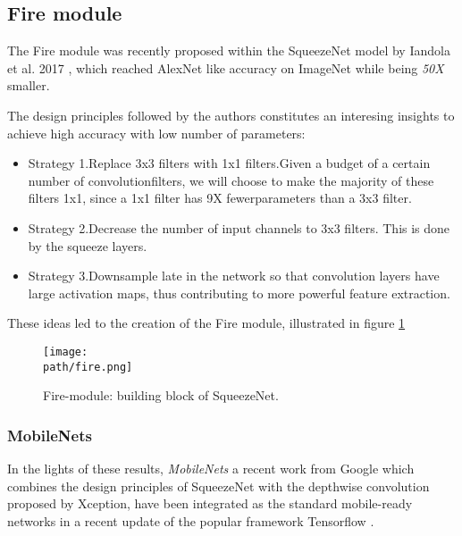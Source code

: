 \subsection{Fire module}
The Fire module was recently proposed within the SqueezeNet model by Iandola et al. 2017 \parencite{squeezenet}, which reached AlexNet like\parencite{alexnet} accuracy on ImageNet while being \emph{50X} smaller. 

The design principles followed by the authors constitutes an interesing insights to achieve high accuracy with low number of parameters:
\begin{itemize}
	\item Strategy 1.Replace 3x3 filters with 1x1 filters.Given a budget of a certain number of convolutionfilters,  we will choose to make the majority of these filters 1x1,  since a 1x1 filter has 9X fewerparameters than a 3x3 filter.
	
	\item Strategy 2.Decrease the number of input channels to 3x3 filters. This is done by the squeeze layers.
	
	\item Strategy 3.Downsample late in the network so that convolution layers have large activation maps, thus contributing to more powerful feature extraction. 


\end{itemize}


These ideas led to the creation of the Fire module, illustrated in figure \ref{fig:fire}

\begin{figure}[h!]
 \centering
 \texttt{[image: \\path/fire.png]} 
 \caption{Fire-module: building block of SqueezeNet.}
 \label{fig:fire}
\end{figure}


\subsubsection{MobileNets}
 In the lights of these results, \emph{MobileNets} a recent work from Google \parencite{mobilenets} which combines the design principles of SqueezeNet with the depthwise convolution proposed by Xception, have been integrated as the standard mobile-ready networks in a recent update of the popular framework Tensorflow \parencite{tensorflow}.



